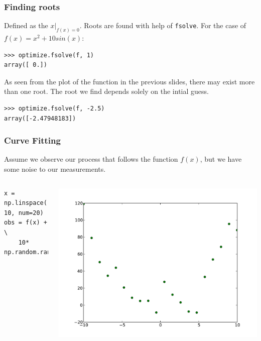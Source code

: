\documentclass[10pt,colorlinks]{beamer}
\begin{document}
\begin{frame}[fragile]\frametitle{Finding roots}
  Defined as the $x|_{f(x)=0}$. Roots are found with help of \verb|fsolve|. For the case of $f(x)=x^2 + 10 sin(x) $:
\begin{verbatim}
>>> optimize.fsolve(f, 1)
array([ 0.])
\end{verbatim}

As seen from the plot of the function in the previous slides, there may exist more than one root. The root we find depends solely on the intial guess.

\begin{verbatim}
>>> optimize.fsolve(f, -2.5)
array([-2.47948183])
\end{verbatim}

    
\end{frame}

\begin{frame}[fragile]\frametitle{Curve Fitting}
  Assume we observe our process that follows the function $f(x)$, but we have some noise to our measurements. 

\begin{columns}[c]
\small
\begin{verbatim}
x = np.linspace(-10, 10, num=20)
obs = f(x) + \
    10* np.random.randn(x.size)
\end{verbatim}

\includegraphics[width=\textwidth]{plwfigis/CursP_3_figure44}

\end{columns}

\end{frame}
\end{document}
